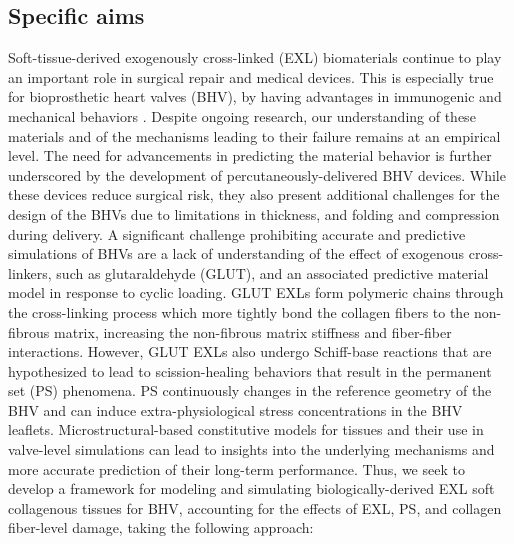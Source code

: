 \subsection{Specific aims}
    Soft-tissue-derived exogenously cross-linked (EXL) biomaterials continue to play an important role in surgical repair and medical devices. This is especially true for bioprosthetic heart valves (BHV), by having advantages in immunogenic and mechanical behaviors \cite{starr_artificial_2007}. Despite ongoing research, our understanding of these materials and of the mechanisms leading to their failure remains at an empirical level. The need for advancements in predicting the material behavior is further underscored by the development of percutaneously-delivered BHV devices. While these devices reduce surgical risk, they also present additional challenges for the design of the BHVs due to limitations in thickness, and folding and compression during delivery. A significant challenge prohibiting accurate and predictive simulations of BHVs are a lack of understanding of the effect of exogenous cross-linkers, such as glutaraldehyde (GLUT), and an associated predictive material model in response to cyclic loading. GLUT EXLs form polymeric chains through the cross-linking process which more tightly bond the collagen fibers to the non-fibrous matrix, increasing the non-fibrous matrix stiffness and fiber-fiber interactions. However, GLUT EXLs also undergo Schiff-base reactions that are hypothesized to lead to scission-healing behaviors that result in the permanent set (PS) phenomena. PS continuously changes in the reference geometry of the BHV and can induce extra-physiological stress concentrations in the BHV leaflets. Microstructural-based constitutive models for tissues and their use in valve-level simulations can lead to insights into the underlying mechanisms and more accurate prediction of their long-term performance. Thus, we seek to develop a framework for modeling and simulating biologically-derived EXL soft collagenous tissues for BHV, accounting for the effects of EXL, PS, and collagen fiber-level damage, taking the following approach:



